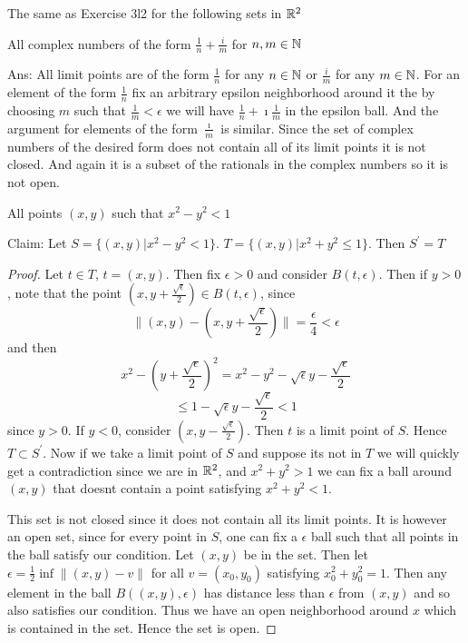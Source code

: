    \question 
    The same as Exercise 3l2 for the following sets in $\mathbb{R}^2$ 

    \begin{alphaparts}
        \questionpart 
        All complex numbers of the form $\frac{1}{n} + \frac{i}{m}$ for $n, m \in \mathbb{N}$ 

        Ans: 
        All limit points are of the form $\frac{1}{n}$ for any $n \in \mathbb{N}$ or $\frac{i}{m}$ for any $m \in \mathbb{N}$. 
        For an element of the form $\frac{1}{n}$ fix an arbitrary epsilon neighborhood around it the by choosing $m$ such that 
        $\frac{1}{m} < \epsilon$ we will have $\frac{1}{n} + \imath \frac{1}{m}$ in the epsilon ball. And the argument for 
        elements of the form $\frac{\imath}{m}$ is similar. Since the set of complex numbers of the desired form does not contain all of 
        its limit points it is not closed. And again it is a subset of the rationals in the complex numbers so it is not open. 
        
        \questionpart
        All points $(x, y) $ such that $x^2 - y^2 < 1$ 

        Claim: Let $S = \{(x, y) | x^2 - y^2 < 1\}$. 
         $T = \{(x, y) | x^2 + y^2 \leq 1\}$.
         Then $S^\prime = T$


         \begin{proof}
            Let $t \in T$, $t = (x, y)$. Then fix $\epsilon > 0$ and consider $B(t, \epsilon)$. 
            Then if $y > 0$, note that the point $(x, y + \frac{\sqrt{\epsilon}}{2}) \in B(t, \epsilon)$, 
            since 
            \[ \| (x, y) - (x, y + \frac{\sqrt{\epsilon}}{2}) \| = \frac{\epsilon}{4} < \epsilon \]
            and then 
            \[x^2 - (y + \frac{\sqrt{\epsilon}}{2})^2 = x^2 - y^2 - \sqrt{\epsilon}y - \frac{\sqrt{\epsilon}}{2}\]
            \[\leq 1 - \sqrt{\epsilon}y - \frac{\sqrt{\epsilon}}{2} < 1\]
            since $y > 0$. If $y < 0$, consider $(x, y - \frac{\sqrt{\epsilon}}{2})$. 
            Then $t$ is a limit point of $S$. Hence $T \subset S^\prime$. 
            Now if we take a limit point of $S$ and suppose its not in $T$ we will quickly get a contradiction 
            since we are in $\mathbb{R}^2$, and $x^2 + y^2 > 1$ we can fix a ball around $(x, y)$ that doesnt contain a point 
            satisfying $x^2 + y^2 < 1$. 

            This set is not closed since it does not contain all its limit points. It is however an open set, 
            since for every point in $S$, one can fix a $\epsilon$ ball such that all points in the ball satisfy our condition. Let 
            $(x, y)$ be in the set. Then 
            let $\epsilon = \frac{1}{2}\inf{\|(x, y) - v \|}$ for all $v = (x_0, y_0)$ satisfying $x_0^2 + y_0^2 = 1$. 
            Then any element in the ball $B((x, y), \epsilon)$ has distance less than $\epsilon$ from $(x, y)$ and so also satisfies 
            our condition. Thus we have an open neighborhood around $x$ which is contained in the set. Hence the set is open. 


\end{proof}
\end{alphaparts}
